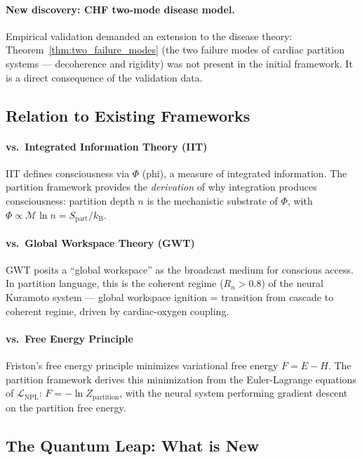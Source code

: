 \documentclass[10pt,twocolumn,a4paper]{article}
\theoremstyle{definition}
\newcommand{\kB}{k_{\text{B}}}
\newcommand{\LNPL}{\mathcal{L}_{\text{NPL}}}
\begin{document}
\paragraph{New discovery: CHF two-mode disease model.}
Empirical validation demanded an extension to the disease theory: Theorem~\ref{thm:two_failure_modes}
(the two failure modes of cardiac partition systems --- decoherence and rigidity)
was not present in the initial framework. It is a direct consequence of the validation data.

\subsection{Relation to Existing Frameworks}

\paragraph{vs.\ Integrated Information Theory (IIT)~\cite{tononi2004information,tononi2016integrated}}
IIT defines consciousness via $\Phi$ (phi), a measure of integrated information.
The partition framework provides the \emph{derivation} of why integration
produces consciousness: partition depth $n$ is the mechanistic substrate of $\Phi$,
with $\Phi \propto \mathcal{M} \ln n = S_{\text{part}}/\kB$.

\paragraph{vs.\ Global Workspace Theory (GWT)~\cite{baars1988cognitive,dehaene2011experimental}}
GWT posits a ``global workspace'' as the broadcast medium for conscious access.
In partition language, this is the coherent regime ($R_n > 0.8$) of the
neural Kuramoto system — global workspace ignition = transition from cascade
to coherent regime, driven by cardiac-oxygen coupling.

\paragraph{vs.\ Free Energy Principle~\cite{friston2010free,friston2006free}}
Friston's free energy principle minimizes variational free energy $F = E - H$.
The partition framework derives this minimization from the Euler-Lagrange
equations of $\LNPL$: $F = -\ln Z_{\text{partition}}$, with the neural
system performing gradient descent on the partition free energy.

\subsection{The Quantum Leap: What is New}
\end{document}
